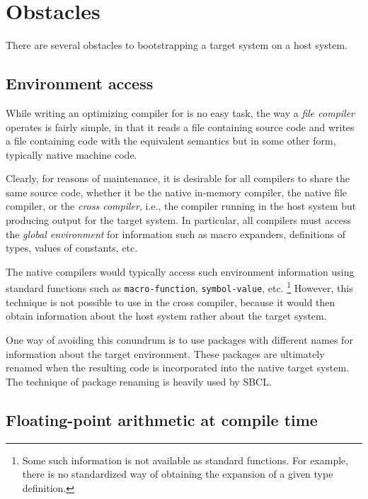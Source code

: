 \section{Obstacles}

There are several obstacles to bootstrapping a target \commonlisp{}
system on a host \commonlisp{} system.

\subsection{Environment access}

While writing an optimizing compiler for \commonlisp{} is no easy
task, the way a \emph{file compiler} operates is fairly simple, in
that it reads a file containing source code and writes a file
containing code with the equivalent semantics but in some other form,
typically native machine code.

Clearly, for reasons of maintenance, it is desirable for all compilers
to share the same source code, whether it be the native in-memory
compiler, the native file compiler, or the \emph{cross compiler},
i.e., the compiler running in the host \commonlisp{} system but
producing output for the target system.  In particular, all compilers
must access the \emph{global environment} for information such as
macro expanders, definitions of types, values of constants, etc.

The native compilers would typically access such environment
information using standard functions such as \texttt{macro-function},
\texttt{symbol-value}, etc.%
\footnote{Some such information is not available as standard
  functions.  For example, there is no standardized way of obtaining
  the expansion of a given type definition.}
However, this technique is not possible to use in the cross compiler,
because it would then obtain information about the host \commonlisp{}
system rather about the target \commonlisp{} system.

One way of avoiding this conundrum is to use packages with different
names for information about the target environment.  These packages
are ultimately renamed when the resulting code is incorporated into
the native target system.  The technique of package renaming is
heavily used by SBCL.

\subsection{Floating-point arithmetic at compile time}

